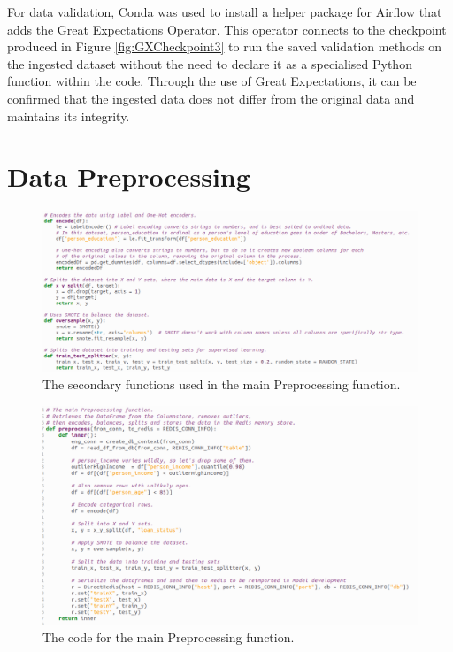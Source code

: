 \documentclass[12pt]{report}
\newcommand{\para}{\vspace{7pt}\noindent}
\begin{document}
\para For data validation,
Conda was used to install a helper package for Airflow that adds the Great Expectations Operator.
This operator connects to the checkpoint produced in Figure \ref{fig:GXCheckpoint3} to run the saved validation 
methods on the ingested dataset without the need to declare it as a specialised Python function within 
the code. Through the use of Great Expectations, it can be confirmed that the ingested data does not differ 
from the original data and maintains its integrity.

\section{Data Preprocessing}\label{sec:ImpPreprocessing}

\begin{figure}[H]
    \centering
    \includegraphics[width=\linewidth]{Implementation/.Code/PipelineFunctions/Preprocessing1.png}
    \caption{The secondary functions used in the main Preprocessing function.}
    \label{fig:PreprocessingCode1}
\end{figure}

\begin{figure}[H]
    \centering
    \includegraphics[width=\linewidth]{Implementation/.Code/PipelineFunctions/Preprocessing2.png}
    \caption{The code for the main Preprocessing function.}
    \label{fig:PreprocessingCode2}
\end{figure}
\end{document}
